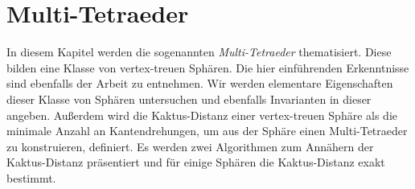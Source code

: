 \documentclass[12pt,titlepage,twoside,cleardoublepage]{article}
\theoremstyle{nummermitklammern}
\numberwithin{equation}{section}
\begin{document}

\newpage
\section{Multi-Tetraeder}\label{kapitelmultitetraeder}
In diesem Kapitel werden die sogenannten \emph{Multi-Tetraeder} thematisiert. Diese bilden eine Klasse von vertex-treuen Sphären. Die hier einführenden Erkenntnisse sind ebenfalls der Arbeit \cite{simp} zu entnehmen. Wir werden elementare Eigenschaften dieser Klasse von Sphären untersuchen und ebenfalls Invarianten in dieser angeben. Außerdem wird die Kaktus-Distanz einer vertex-treuen Sphäre als die minimale Anzahl an Kantendrehungen, um aus der Sphäre einen Multi-Tetraeder zu konstruieren, definiert. Es werden zwei Algorithmen zum Annähern der Kaktus-Distanz präsentiert und für einige Sphären die Kaktus-Distanz exakt bestimmt.
\end{document}
